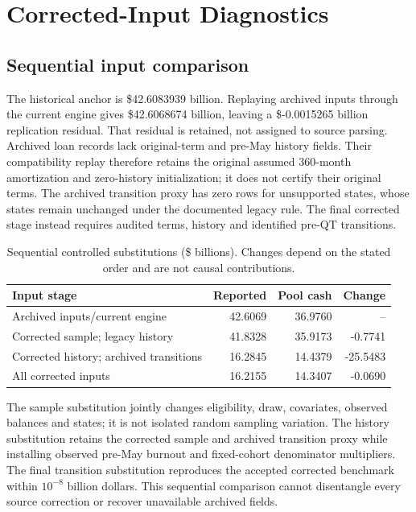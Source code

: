 \section{Corrected-Input Diagnostics}\label{app:correcteddiagnostics}
\subsection{Sequential input comparison}
The historical anchor is \$42.6083939 billion. Replaying archived inputs through the current engine gives \$42.6068674 billion, leaving a \$-0.0015265 billion replication residual. That residual is retained, not assigned to source parsing. Archived loan records lack original-term and pre-May history fields. Their compatibility replay therefore retains the original assumed 360-month amortization and zero-history initialization; it does not certify their original terms. The archived transition proxy has zero rows for unsupported states, whose states remain unchanged under the documented legacy rule. The final corrected stage instead requires audited terms, history and identified pre-QT transitions.

\begin{table}[H]\centering\small
\caption{Sequential controlled substitutions (\$ billions). Changes depend on the stated order and are not causal contributions.}\label{tab:correctedbridge}
\begin{tabular}{@{}p{5.7 cm}rrr@{}}\toprule
Input stage & Reported & Pool cash & Change\\\midrule
Archived inputs/current engine & 42.6069 & 36.9760 & -- \\
Corrected sample; legacy history & 41.8328 & 35.9173 & -0.7741 \\
Corrected history; archived transitions & 16.2845 & 14.4379 & -25.5483 \\
All corrected inputs & 16.2155 & 14.3407 & -0.0690 \\
\bottomrule\end{tabular}\end{table}

The sample substitution jointly changes eligibility, draw, covariates, observed balances and states; it is not isolated random sampling variation. The history substitution retains the corrected sample and archived transition proxy while installing observed pre-May burnout and fixed-cohort denominator multipliers. The final transition substitution reproduces the accepted corrected benchmark within $10^{-8}$ billion dollars. This sequential comparison cannot disentangle every source correction or recover unavailable archived fields.

